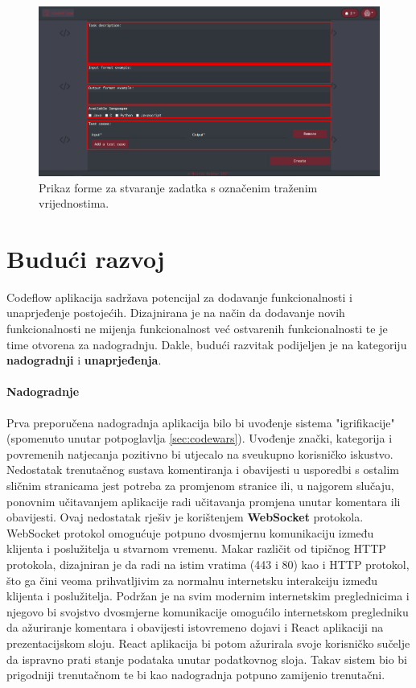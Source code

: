 \documentclass[times, utf8, zavrsni, numeric]{fer}
\begin{document}
		\begin{figure}[H]
			\centering
			\includegraphics[width=\linewidth]{pictures/koristenje/FormaStvaranja.png}
			\caption{Prikaz forme za stvaranje zadatka s označenim traženim vrijednostima.}
			\label{fig:stvaranjeforma}
		\end{figure}
		
	\chapter{Budući razvoj}
	Codeflow aplikacija sadržava potencijal za dodavanje funkcionalnosti i unaprjeđenje postojećih. Dizajnirana je na način da dodavanje novih funkcionalnosti ne mijenja funkcionalnost već ostvarenih funkcionalnosti te je time otvorena za nadogradnju.
	Dakle, budući razvitak podijeljen je na kategoriju \textbf{nadogradnji} i \textbf{unaprjeđenja}.
	\subsubsection{Nadogradnje}
	Prva preporučena nadogradnja aplikacija bilo bi uvođenje sistema "igrifikacije" (spomenuto unutar potpoglavlja \ref{sec:codewars}). Uvođenje znački, kategorija i povremenih natjecanja pozitivno bi utjecalo na sveukupno korisničko iskustvo.\\
	Nedostatak trenutačnog sustava komentiranja i obavijesti u usporedbi s ostalim sličnim stranicama jest potreba za promjenom stranice ili, u najgorem slučaju, ponovnim učitavanjem aplikacije radi učitavanja promjena unutar komentara ili obavijesti. Ovaj nedostatak rješiv je korištenjem \textbf{WebSocket} protokola. WebSocket\cite{websocket2021} protokol omogućuje potpuno dvosmjernu komunikaciju između klijenta i poslužitelja u stvarnom vremenu. Makar različit od tipičnog HTTP protokola, dizajniran je da radi na istim vratima  (443 i 80) kao i HTTP protokol, što ga čini veoma prihvatljivim za normalnu internetsku interakciju između klijenta i poslužitelja. Podržan je na svim modernim internetskim preglednicima i njegovo bi svojstvo dvosmjerne komunikacije omogućilo internetskom pregledniku da ažuriranje komentara i obavijesti istovremeno dojavi i React aplikaciji na prezentacijskom sloju. React aplikacija bi potom ažurirala svoje korisničko sučelje da ispravno prati stanje podataka unutar podatkovnog sloja. Takav sistem bio bi prigodniji trenutačnom te bi kao nadogradnja potpuno zamijenio trenutačni.
\end{document}
